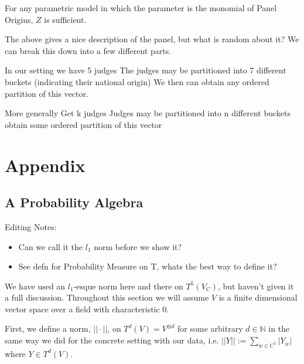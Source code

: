 \documentclass{article}
\begin{document}
For any parametric model in which the parameter is the monomial of Panel Origins, $Z$ is sufficient.

The above gives a nice description of the panel, but what is random about it? We can break this down into a few different parts.

In our setting we have 5 judges
The judges may be partitioned into 7 different buckets (indicating their national origin)
We then can obtain any ordered partition of this vector. 

More generally
Get k judges
Judges may be partitioned into n different buckets
obtain some ordered partition of this vector


\section{Appendix}
\subsection{A Probability Algebra}
Editing Notes:
\begin{itemize}
\item Can we call it the $l_1$ norm  before we show it?
\item See defn for Probability Measure on T, whats the best way to define it?
\end{itemize}

We have used an $l_1$-esque norm here and there on $T^5(V_C)$, but haven't given it a full discussion. Throughout this section we will assume $V$ is a finite dimensional vector space over a field with characteristic 0.

First, we define a norm, $||\cdot ||$, on $T^d(V) = V^{\otimes d}$ for some arbitrary $d\in \mathbb{N}$ in the same way we did for the concrete setting with our data, i.e. $|| Y || := \sum_{w \in C^5} |Y_w|$ where $Y\in T^d(V)$.
\end{document}
